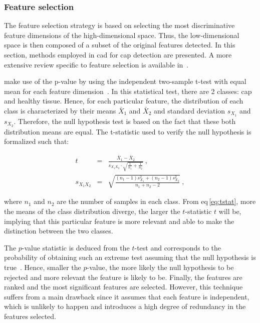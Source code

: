 \subsubsection{Feature selection}\label{subsubsec:chp3:img-clas:CADX:fea-ext:sel}
The feature selection strategy is based on selecting the most discriminative feature dimensions of the high-dimensional space.
Thus, the low-dimensional space is then composed of a subset of the original features detected.
In this section, methods employed in \ac{cad} for \ac{cap} detection are presented.
A more extensive review specific to feature selection is available in~\cite{Saeys2007}.

\citeauthor{Niaf2012} make use of the p-value by using the independent two-sample t-test with equal mean for each feature dimension~\cite{Niaf2011,Niaf2012}.
In this statistical test, there are 2 classes: \ac{cap} and healthy tissue.
Hence, for each particular feature, the distribution of each class is characterized by their means $\bar{X}_1$ and $\bar{X}_2$ and standard deviation $s_{X_1}$ and $s_{X_2}$.
Therefore, the null hypothesis test is based on the fact that these both distribution means are equal.
The t-statistic used to verify the null hypothesis is formalized such that:

\begin{eqnarray}
t & = & \frac{\bar {X}_1 - \bar{X}_2}{s_{X_1X_2} \cdot \sqrt{\frac{1}{n_1}+\frac{1}{n_2}}} \ , \label{eq:tstat} \\
s_{X_1X_2} & = & \sqrt{\frac{(n_1-1)s_{X_1}^2+(n_2-1)s_{X_2}^2}{n_1+n_2-2}} \ , \nonumber
\end{eqnarray}

\noindent where $n_1$ and $n_2$ are the number of samples in each class.
From \acs{eq}\,\eqref{eq:tstat}, more the means of the class distribution diverge, the larger the $t$-statistic $t$ will be, implying that this particular feature is more relevant and able to make the distinction between the two classes. 

The $p$-value statistic is deduced from the $t$-test and corresponds to the probability of obtaining such an extreme test assuming that the null hypothesis is true~\cite{Goodman1999}.
Hence, smaller the $p$-value, the more likely the null hypothesis to be rejected and more relevant the feature is likely to be.
Finally, the features are ranked and the most significant features are selected.
However, this technique suffers from a main drawback since it assumes that each feature is independent, which is unlikely to happen and introduces a high degree of redundancy in the features selected.

